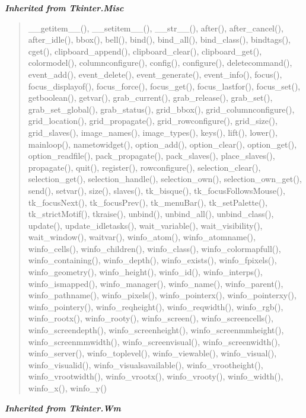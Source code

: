\large{\textbf{\textit{Inherited from Tkinter.Misc}}}

\begin{quote}
\_\_getitem\_\_(), \_\_setitem\_\_(), \_\_str\_\_(), after(), after\_cancel(), after\_idle(), bbox(), bell(), bind(), bind\_all(), bind\_class(), bindtags(), cget(), clipboard\_append(), clipboard\_clear(), clipboard\_get(), colormodel(), columnconfigure(), config(), configure(), deletecommand(), event\_add(), event\_delete(), event\_generate(), event\_info(), focus(), focus\_displayof(), focus\_force(), focus\_get(), focus\_lastfor(), focus\_set(), getboolean(), getvar(), grab\_current(), grab\_release(), grab\_set(), grab\_set\_global(), grab\_status(), grid\_bbox(), grid\_columnconfigure(), grid\_location(), grid\_propagate(), grid\_rowconfigure(), grid\_size(), grid\_slaves(), image\_names(), image\_types(), keys(), lift(), lower(), mainloop(), nametowidget(), option\_add(), option\_clear(), option\_get(), option\_readfile(), pack\_propagate(), pack\_slaves(), place\_slaves(), propagate(), quit(), register(), rowconfigure(), selection\_clear(), selection\_get(), selection\_handle(), selection\_own(), selection\_own\_get(), send(), setvar(), size(), slaves(), tk\_bisque(), tk\_focusFollowsMouse(), tk\_focusNext(), tk\_focusPrev(), tk\_menuBar(), tk\_setPalette(), tk\_strictMotif(), tkraise(), unbind(), unbind\_all(), unbind\_class(), update(), update\_idletasks(), wait\_variable(), wait\_visibility(), wait\_window(), waitvar(), winfo\_atom(), winfo\_atomname(), winfo\_cells(), winfo\_children(), winfo\_class(), winfo\_colormapfull(), winfo\_containing(), winfo\_depth(), winfo\_exists(), winfo\_fpixels(), winfo\_geometry(), winfo\_height(), winfo\_id(), winfo\_interps(), winfo\_ismapped(), winfo\_manager(), winfo\_name(), winfo\_parent(), winfo\_pathname(), winfo\_pixels(), winfo\_pointerx(), winfo\_pointerxy(), winfo\_pointery(), winfo\_reqheight(), winfo\_reqwidth(), winfo\_rgb(), winfo\_rootx(), winfo\_rooty(), winfo\_screen(), winfo\_screencells(), winfo\_screendepth(), winfo\_screenheight(), winfo\_screenmmheight(), winfo\_screenmmwidth(), winfo\_screenvisual(), winfo\_screenwidth(), winfo\_server(), winfo\_toplevel(), winfo\_viewable(), winfo\_visual(), winfo\_visualid(), winfo\_visualsavailable(), winfo\_vrootheight(), winfo\_vrootwidth(), winfo\_vrootx(), winfo\_vrooty(), winfo\_width(), winfo\_x(), winfo\_y()
\end{quote}

\large{\textbf{\textit{Inherited from Tkinter.Wm}}}

